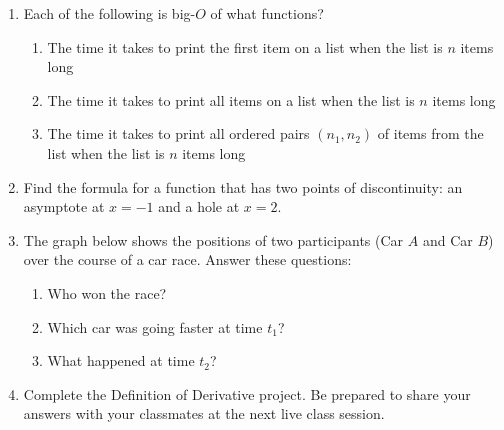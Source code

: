 \documentclass{article}
\begin{document}
\begin{itemize}
\begin{enumerate}
    	\item Each of the following is big-$O$ of what functions?
    	\begin{enumerate}
    	    \item The time it takes to print the first item on a list when the list is $n$ items long
    	    \item The time it takes to print all items on a list when the list is $n$ items long
    	    \item The time it takes to print all ordered pairs $(n_1, n_2)$ of items from the list when the list is $n$ items long
    	\end{enumerate}
    	\item Find the formula for a function that has two points of discontinuity: an asymptote at $x=-1$ and a hole at $x=2$.
    	\item The graph below shows the positions of two participants (Car $A$ and Car $B$) over the course of a car race. Answer these questions:
    	\begin{enumerate}
    	    \item Who won the race?
    	    \item Which car was going faster at time $t_1$?
    	    \item What happened at time $t_2$?
    	\end{enumerate}
    	\begin{center}
    	\end{center}
        \item Complete the Definition of Derivative project. Be prepared to share your answers with your classmates at the next live class session. 
    	\end{enumerate}

\end{itemize}
\end{document}
